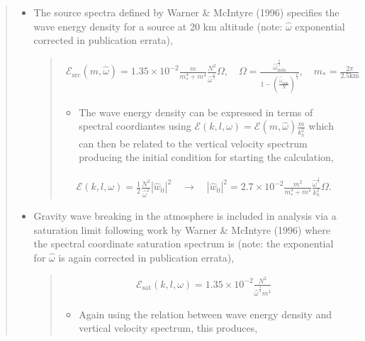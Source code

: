 \documentclass[letterpaper,10pt,english]{sphinxmanual}
\begin{document}
\begin{itemize}
\begin{quote}
\begin{itemize}
\begin{quote}
\begin{itemize}
\end{itemize}
\end{quote}

\item {} 
The source spectra defined by Warner \& McIntyre (1996) specifies the wave energy density for a source at 20 km altitude (note: \(\hat{\omega}\) exponential corrected in publication errata),
\begin{quote}
\begin{equation*}
\begin{split}\mathcal{E}_\text{src} \left(m, \hat{\omega} \right) = 1.35 \times 10^{-2} \frac{m}{m_*^4 + m^4} \frac{N^2}{\hat{\omega}^\frac{5}{3}} \Omega, \quad \Omega = \frac{\hat{\omega}_\text{min}^\frac{2}{3}}{1 - \left( \frac{\hat{\omega}_\text{min}}{N} \right)^\frac{2}{3}}, \quad m_* = \frac{2 \pi}{2.5 \text{km}}\end{split}
\end{equation*}\begin{itemize}
\item {} 
The wave energy density can be expressed in terms of spectral coordiantes using \(\mathcal{E} \left( k, l, \omega \right) = \mathcal{E} \left( m, \hat{\omega} \right) \frac{m}{k_h^2}\) which can then be related to the vertical velocity spectrum producing the initial condition for starting the calculation,

\end{itemize}
\begin{equation*}
\begin{split}\mathcal{E} \left(k, l, \omega \right) = \frac{1}{2} \frac{N^2}{\hat{\omega}^2} \left| \hat{w}_0 \right|^2 \quad \rightarrow \quad \left| \hat{w}_0 \right|^2 = 2.7 \times 10^{-2} \frac{m^2}{m^4_* + m^4}  \frac{\hat{\omega}^\frac{1}{3}}{k_h^2} \Omega.\end{split}
\end{equation*}\end{quote}

\item {} 
Gravity wave breaking in the atmosphere is included in analysis via a saturation limit following work by Warner \& McIntyre (1996) where the spectral coordinate saturation spectrum is (note: the exponential for \(\hat{\omega}\) is again corrected in publication errata),
\begin{quote}
\begin{equation*}
\begin{split}\mathcal{E}_\text{sat} \left(k, l, \omega \right) = 1.35 \times 10^{-2} \frac{N^2}{\hat{\omega}^\frac{5}{3} m^3}\end{split}
\end{equation*}\begin{itemize}
\item {} 
Again using the relation between wave energy density and vertical velocity spectrum, this produces,


\end{itemize}
\end{quote}
\end{itemize}
\end{quote}
\end{itemize}
\end{document}

